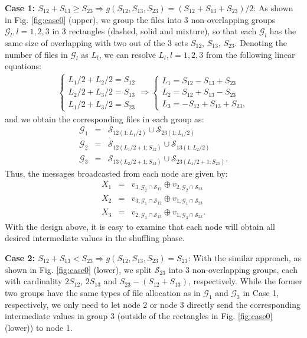 \documentclass[conference]{IEEEtran}
\begin{document}
{\bf Case 1: $S_{12}+ S_{13}\geq S_{23}\Rightarrow g(S_{12},S_{13},S_{23})=(S_{12}+S_{13}+S_{23})/2$}: As shown in Fig. \ref{fig:case0} (upper), we group the files into 3 non-overlapping groups $\mathcal{G}_l,l=1,2,3$ in 3 rectangles (dashed, solid and mixture), so that each $\mathcal{G}_l$ has the same size of overlapping with two out of the 3 sets $S_{12}$, $S_{13}$, $S_{23}$. %
Denoting the number of files in $\mathcal{G}_l$ as $L_l$, we can resolve $L_l,l=1,2,3$ from the following linear equations:
\begin{eqnarray}
\left\{\begin{array}{l}L_1/2+L_2/2=S_{12}\\L_2/2+L_3/2=S_{13}\\L_1/2+L_3/2=S_{23}\end{array}\right.\Longrightarrow \left\{\begin{array}{l}L_1=S_{12}-S_{13}+S_{23}\\L_2=S_{12}+S_{13}-S_{23}\\L_3=-S_{12}+S_{13}+S_{23},\end{array}\right.
\end{eqnarray}
and we obtain the corresponding files in each group as:
\begin{eqnarray}
\mathcal{G}_1&\!\!\!\!=\!\!\!\!&\mathcal{S}_{12(1:L_1/2)}\cup\mathcal{S}_{23(1:L_1/2)}\\
\mathcal{G}_2&\!\!\!\!=\!\!\!\!&\mathcal{S}_{12(L_1/2+1:S_{12})}\cup\mathcal{S}_{13(1:L_2/2)}\\
\mathcal{G}_3&\!\!\!\!=\!\!\!\!&\mathcal{S}_{13(L_2/2+1:S_{13})}\cup\mathcal{S}_{23(L_1/2+1:S_{23})}.
\end{eqnarray}
Thus, the messages broadcasted from each node are given by:
\begin{eqnarray}
X_1&\!\!\!\!=\!\!\!\!&v_{3,\mathcal{G}_2\cap\mathcal{S}_{12}}\oplus v_{2,\mathcal{G}_2\cap\mathcal{S}_{23}}\\
X_2&\!\!\!\!=\!\!\!\!&v_{3,\mathcal{G}_1\cap\mathcal{S}_{12}}\oplus v_{1,\mathcal{G}_1\cap\mathcal{S}_{23}}\\
X_3&\!\!\!\!=\!\!\!\!&v_{2,\mathcal{G}_3\cap\mathcal{S}_{13}}\oplus v_{1,\mathcal{G}_3\cap\mathcal{S}_{23}}.
\end{eqnarray}
With the design above, it is easy to examine that each node will obtain all desired intermediate values in the shuffling phase.

{\bf Case 2: $S_{12}+ S_{13}< S_{23}\Rightarrow g(S_{12},S_{13},S_{23})=S_{23}$}: With the similar approach, as shown in Fig. \ref{fig:case0} (lower), we split $\mathcal{S}_{23}$ into 3 non-overlapping groups, each with cardinality $2S_{12}$, $2S_{13}$ and $S_{23}-(S_{12}+S_{13})$, respectively. While the former two groups have the same types of file allocation as in $\mathcal{G}_1$ and $\mathcal{G}_3$ in Case 1, respectively, we only need to let node 2 or node 3 directly send the corresponding intermediate values in group 3 (outside of the rectangles in Fig. \ref{fig:case0} (lower)) to node 1. \hfill\QED
\end{document}
